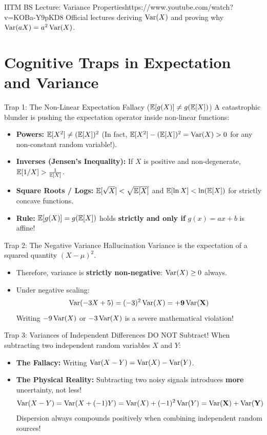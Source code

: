 \begin{videocard}{IITM BS Lecture: Variance Properties}{https://www.youtube.com/watch?v=KOBa-Y9pKD8}
Official lectures deriving $\operatorname{Var}(X)$ and proving why $\operatorname{Var}(aX) = a^2\operatorname{Var}(X)$.
\end{videocard}

\section{Cognitive Traps in Expectation and Variance}

\begin{trapbox}{Trap 1: The Non-Linear Expectation Fallacy ($\mathbb{E}[g(X)] \neq g(\mathbb{E}[X])$)}
A catastrophic blunder is pushing the expectation operator inside non-linear functions:
\begin{itemize}
    \item \textbf{Powers:} $\mathbb{E}[X^2] \neq (\mathbb{E}[X])^2$ (In fact, $\mathbb{E}[X^2] - (\mathbb{E}[X])^2 = \operatorname{Var}(X) > 0$ for any non-constant random variable!).
    \item \textbf{Inverses (Jensen's Inequality):} If $X$ is positive and non-degenerate, $\mathbb{E}[1/X] > \frac{1}{\mathbb{E}[X]}$.
    \item \textbf{Square Roots / Logs:} $\mathbb{E}[\sqrt{X}] < \sqrt{\mathbb{E}[X]}$ and $\mathbb{E}[\ln X] < \ln(\mathbb{E}[X])$ for strictly concave functions.
    \item \textbf{Rule:} $\mathbb{E}[g(X)] = g(\mathbb{E}[X])$ holds \textbf{strictly and only if} $g(x) = ax + b$ is affine!
\end{itemize}
\end{trapbox}

\begin{trapbox}{Trap 2: The Negative Variance Hallucination}
Variance is the expectation of a squared quantity $(X - \mu)^2$.
\begin{itemize}
    \item Therefore, variance is \textbf{strictly non-negative}: $\operatorname{Var}(X) \ge 0$ always.
    \item Under negative scaling:
    $$\operatorname{Var}(-3X + 5) = (-3)^2 \operatorname{Var}(X) = \mathbf{+9\operatorname{Var}(X)}$$
    Writing $-9\operatorname{Var}(X)$ or $-3\operatorname{Var}(X)$ is a severe mathematical violation!
\end{itemize}
\end{trapbox}

\begin{trapbox}{Trap 3: Variances of Independent Differences DO NOT Subtract!}
When subtracting two independent random variables $X$ and $Y$:
\begin{itemize}
    \item \textbf{The Fallacy:} Writing $\operatorname{Var}(X - Y) = \operatorname{Var}(X) - \operatorname{Var}(Y)$.
    \item \textbf{The Physical Reality:} Subtracting two noisy signals introduces \textbf{more} uncertainty, not less!
    $$\operatorname{Var}(X - Y) = \operatorname{Var}(X + (-1)Y) = \operatorname{Var}(X) + (-1)^2\operatorname{Var}(Y) = \mathbf{\operatorname{Var}(X) + \operatorname{Var}(Y)}$$
    Dispersion always compounds positively when combining independent random sources!
\end{itemize}
\end{trapbox}

